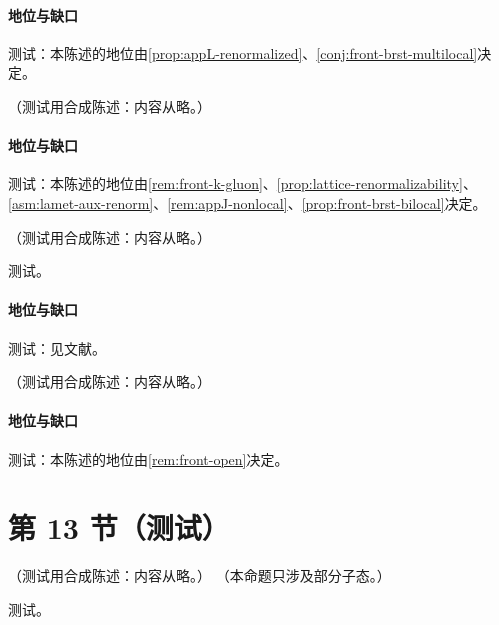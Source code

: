 \paragraph{地位与缺口}测试：本陈述的地位由\cref{prop:appL-renormalized}、\cref{conj:front-brst-multilocal}决定。

\begin{conjecture}\label{conj:front-brst-multilocal}
（测试用合成陈述：内容从略。）
\end{conjecture}
\paragraph{地位与缺口}测试：本陈述的地位由\cref{rem:front-k-gluon}、\cref{prop:lattice-renormalizability}、\cref{asm:lamet-aux-renorm}、\cref{rem:appJ-nonlocal}、\cref{prop:front-brst-bilocal}决定。

\begin{proposition}\label{prop:front-nlo-bk}
（测试用合成陈述：内容从略。）
\end{proposition}
\begin{proofsketch}测试。\end{proofsketch}
\paragraph{地位与缺口}测试：见文献。

\begin{proposition}\label{prop:front-bk-collinear}
（测试用合成陈述：内容从略。）
\end{proposition}
\paragraph{地位与缺口}测试：本陈述的地位由\cref{rem:front-open}决定。

\section{第 13 节（测试）}\label{sec:front-jets}

\begin{proposition}\label{prop:front-regge}
（测试用合成陈述：内容从略。）
（本命题只涉及部分子态。）
\end{proposition}
\begin{proofsketch}测试。\end{proofsketch}
